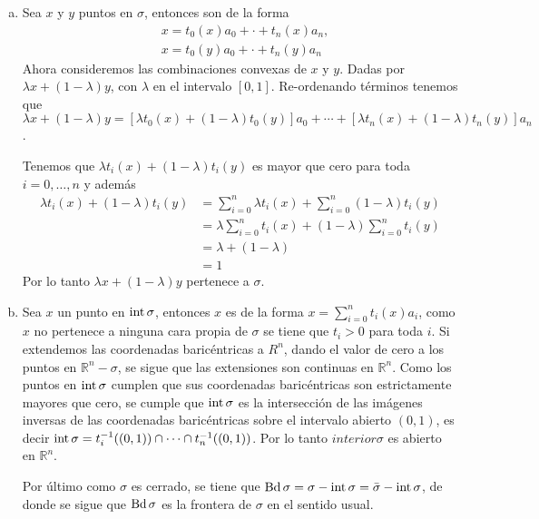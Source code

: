 \begin{Dem}
\begin{enumerate}[(a)]
\item Sea $x$ y $y$ puntos en $\sigma$, entonces son de la forma
\begin{align*}
&x = t_0(x)a_0+\cdot +t_n(x)a_n ,\\
&x = t_0(y)a_0+\cdot +t_n(y)a_n
\end{align*}
Ahora consideremos las combinaciones convexas de $x$ y $y$. Dadas por 
$\lambda x + (1-\lambda)y$, con $\lambda$ en el intervalo $[0,1]$. 
Re-ordenando términos tenemos que
$\lambda x + (1-\lambda)y = [\lambda t_0(x)+(1-\lambda)t_0(y)]a_0+\cdots + [\lambda t_n(x)+(1-\lambda)t_n(y)]a_n$. 

Tenemos que $\lambda t_i(x)+(1-\lambda)t_i(y)$ es mayor que cero para toda $i = 0,\ldots ,n$ y además
\begin{align*}
\lambda t_i(x)+(1-\lambda)t_i(y)&=  \sum_{i=0}^{n}\lambda t_i(x)+\sum_{i=0}^{n}(1-\lambda)t_i(y) \\
&= \lambda\sum_{i=0}^{n}t_i(x)+(1-\lambda)\sum_{i=0}^{n}t_i(y)\\ 
&= \lambda + (1-\lambda)\\
& = 1
\end{align*}
Por lo tanto $\lambda x + (1-\lambda)y$ pertenece a $\sigma$.

\item Sea $x$ un punto en $\operatorname{int} \sigma$, entonces $x$ es de la forma $x = \sum_{i=0}^{n} t_i(x)a_i$, como $x$ no pertenece a ninguna cara propia de $\sigma$ se tiene que $t_i>0$ para toda $i$.
Si extendemos las coordenadas baricéntricas a $R^n$, dando el valor de cero a los puntos en $\mathbb{R}^n-\sigma$, se sigue que las extensiones son continuas en $\mathbb{R}^n$.
Como los puntos en $\operatorname{int} \sigma$ cumplen que sus coordenadas baricéntricas son estrictamente mayores que cero, se cumple que $\operatorname{int} \sigma$ es la intersección de las imágenes inversas de las coordenadas baricéntricas sobre el intervalo abierto $(0,1)$, es decir $\operatorname{int} \sigma = t_i^{-1}((0,1))\cap\cdots\cap t_n^{-1}((0,1))$. Por lo tanto $interior \sigma$ es abierto en $\mathbb{R}^n$. 

Por último como $\sigma$ es cerrado, se tiene que $\operatorname{Bd} \sigma = \sigma -\operatorname{int} \sigma = \bar{\sigma}-\operatorname{int} \sigma$, de donde se sigue que $\operatorname{Bd} \sigma$ es la frontera de $\sigma$ en el sentido usual.
\end{enumerate}
\end{Dem}

